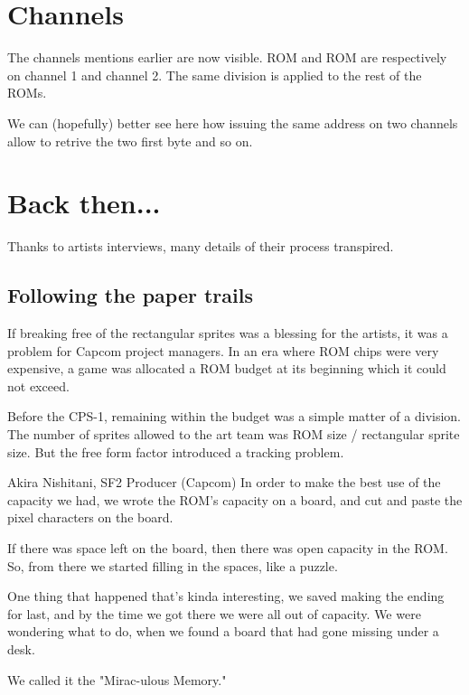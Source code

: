 
\section{Channels}\label{channels}
The channels mentions earlier are now visible. ROM  and ROM  are respectively on channel 1 and channel 2. The same division is applied to the rest of the ROMs. 

We can (hopefully) better see here how issuing the same address on two channels allow to retrive the two first byte and so on.



\section{Back then...}
Thanks to artists interviews, many details of their process transpired.

\subsection{Following the paper trails}
If breaking free of the rectangular sprites was a blessing for the artists, it was a problem for Capcom project managers. In an era where ROM chips were very expensive, a game was allocated a ROM budget at its beginning which it could not exceed.

Before the CPS-1, remaining within the budget was a simple matter of a division. The number of sprites allowed to the art team was ROM size / rectangular sprite size. But the free form factor introduced a tracking problem.

\begin{q}{Akira Nishitani, SF2 Producer (Capcom)}
In order to make the best use of the capacity we had, we wrote the ROM’s capacity on a board, and cut and paste the pixel characters on the board.

If there was space left on the board, then there was open capacity in the ROM. So, from there we started filling in the spaces, like a puzzle.

One thing that happened that's kinda interesting, we saved making the ending for last, and by the time we got there we were all out of capacity. We were wondering what to do, when we found a board that had gone missing under a desk.

We called it the "Mirac-ulous Memory."
\end{q}



